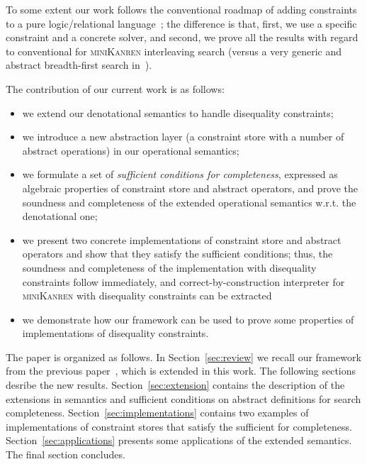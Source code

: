 To some extent our work follows the conventional roadmap of adding constraints to a pure logic/relational language~\cite{CLP}; the difference is that, first,
we use a specific constraint and a concrete solver, and second, we prove all the results with regard to conventional for \textsc{miniKanren} interleaving
search (versus a very generic and abstract breadth-first search in~\cite{CLP}).

The contribution of our current work is as follows:

\begin{itemize}
\item we extend our denotational semantics to handle disequality constraints;
\item we introduce a new abstraction layer (a constraint store with a number of abstract operations) in our operational semantics;
\item we formulate a set of \emph{sufficient conditions for completeness}, expressed as algebraic properties of constraint store and
  abstract operators, and prove the soundness and completeness of the extended operational semantics w.r.t. the denotational one;
\item we present two concrete implementations of constraint store and abstract operators and show that they satisfy the
  sufficient conditions; thus, the soundness and completeness of the implementation with disequality constraints follow
  immediately, and correct-by-construction interpreter for \textsc{miniKanren} with disequality constraints
  can be extracted
\item we demonstrate how our framework can be used to prove some properties of implementations of disequality constraints.
\end{itemize}

The paper is organized as follows. In Section~\ref{sec:review} we recall our framework from the previous paper~\cite{CertifiedSemantics}, which is extended in this work. The following sections desribe the new results. Section~\ref{sec:extension} contains the description of the extensions in semantics and sufficient conditions on abstract definitions for search completeness. Section~\ref{sec:implementations} contains two examples of implementations of constraint stores that satisfy the sufficient for completeness. Section~\ref{sec:applications} presents some applications of the extended semantics. The final section concludes.

